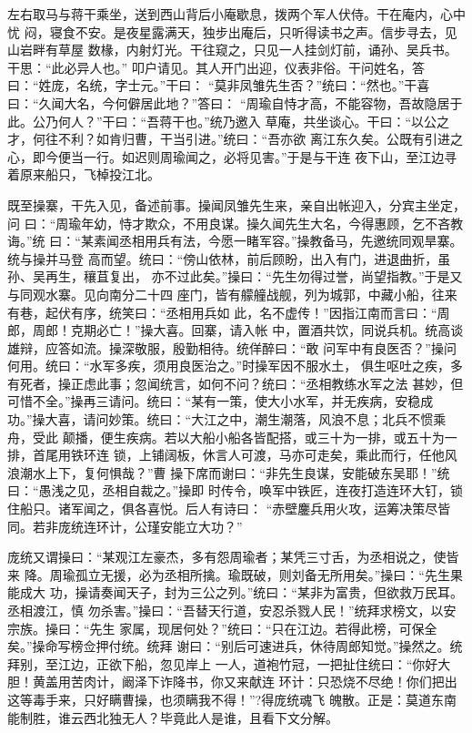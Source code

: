 左右取马与蒋干乘坐，送到西山背后小庵歇息，拨两个军人伏侍。干在庵内，心中忧
闷，寝食不安。是夜星露满天，独步出庵后，只听得读书之声。信步寻去，见山岩畔有草屋
数椽，内射灯光。干往窥之，只见一人挂剑灯前，诵孙、吴兵书。干思：“此必异人也。”
叩户请见。其人开门出迎，仪表非俗。干问姓名，答曰：“姓庞，名统，字士元。”干曰：
“莫非凤雏先生否？”统曰：“然也。”干喜曰：“久闻大名，今何僻居此地？”答曰：
“周瑜自恃才高，不能容物，吾故隐居于此。公乃何人？”干曰：“吾蒋干也。”统乃邀入
草庵，共坐谈心。干曰：“以公之才，何往不利？如肯归曹，干当引进。”统曰：“吾亦欲
离江东久矣。公既有引进之心，即今便当一行。如迟则周瑜闻之，必将见害。”于是与干连
夜下山，至江边寻着原来船只，飞棹投江北。

既至操寨，干先入见，备述前事。操闻凤雏先生来，亲自出帐迎入，分宾主坐定，问
曰：“周瑜年幼，恃才欺众，不用良谋。操久闻先生大名，今得惠顾，乞不吝教诲。”统
曰：“某素闻丞相用兵有法，今愿一睹军容。”操教备马，先邀统同观旱寨。统与操并马登
高而望。统曰：“傍山依林，前后顾盼，出入有门，进退曲折，虽孙、吴再生，穰苴复出，
亦不过此矣。”操曰：“先生勿得过誉，尚望指教。”于是又与同观水寨。见向南分二十四
座门，皆有艨艟战舰，列为城郭，中藏小船，往来有巷，起伏有序，统笑曰：“丞相用兵如
此，名不虚传！”因指江南而言曰：“周郎，周郎！克期必亡！”操大喜。回寨，请入帐
中，置酒共饮，同说兵机。统高谈雄辩，应答如流。操深敬服，殷勤相待。统佯醉曰：“敢
问军中有良医否？”操问何用。统曰：“水军多疾，须用良医治之。”时操军因不服水土，
俱生呕吐之疾，多有死者，操正虑此事；忽闻统言，如何不问？统曰：“丞相教练水军之法
甚妙，但可惜不全。”操再三请问。统曰：“某有一策，使大小水军，并无疾病，安稳成
功。”操大喜，请问妙策。统曰：“大江之中，潮生潮落，风浪不息；北兵不惯乘舟，受此
颠播，便生疾病。若以大船小船各皆配搭，或三十为一排，或五十为一排，首尾用铁环连
锁，上铺阔板，休言人可渡，马亦可走矣，乘此而行，任他风浪潮水上下，复何惧哉？”曹
操下席而谢曰：“非先生良谋，安能破东吴耶！”统曰：“愚浅之见，丞相自裁之。”操即
时传令，唤军中铁匠，连夜打造连环大钉，锁住船只。诸军闻之，俱各喜悦。后人有诗曰：
“赤壁鏖兵用火攻，运筹决策尽皆同。若非庞统连环计，公瑾安能立大功？”

庞统又谓操曰：“某观江左豪杰，多有怨周瑜者；某凭三寸舌，为丞相说之，使皆来
降。周瑜孤立无援，必为丞相所擒。瑜既破，则刘备无所用矣。”操曰：“先生果能成大
功，操请奏闻天子，封为三公之列。”统曰：“某非为富贵，但欲救万民耳。丞相渡江，慎
勿杀害。”操曰：“吾替天行道，安忍杀戮人民！”统拜求榜文，以安宗族。操曰：“先生
家属，现居何处？”统曰：“只在江边。若得此榜，可保全矣。”操命写榜佥押付统。统拜
谢曰：“别后可速进兵，休待周郎知觉。”操然之。统拜别，至江边，正欲下船，忽见岸上
一人，道袍竹冠，一把扯住统曰：“你好大胆！黄盖用苦肉计，阚泽下诈降书，你又来献连
环计：只恐烧不尽绝！你们把出这等毒手来，只好瞒曹操，也须瞒我不得！”?得庞统魂飞
魄散。正是：莫道东南能制胜，谁云西北独无人？毕竟此人是谁，且看下文分解。